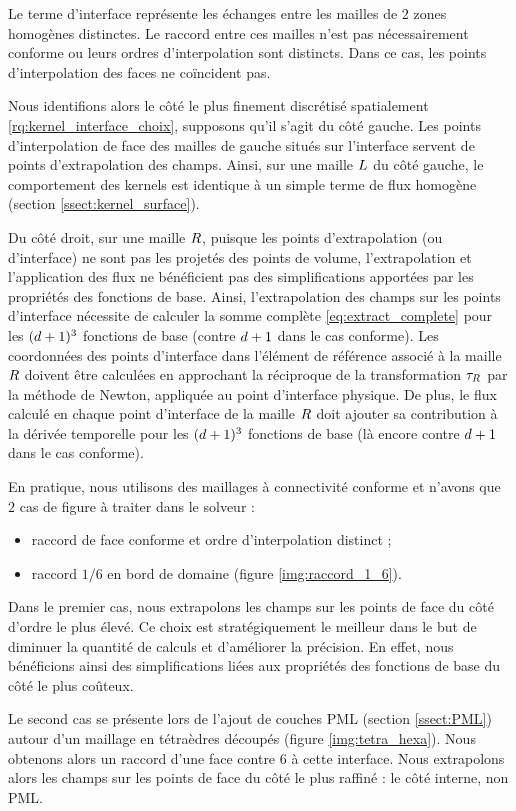 Le terme d'interface représente les échanges entre les
mailles de $2$ zones homogènes distinctes. Le raccord entre ces mailles
n'est pas nécessairement conforme ou leurs ordres d'interpolation sont
distincts. Dans ce cas, les points d'interpolation des faces
ne coïncident pas.

Nous identifions alors le côté le plus finement discrétisé spatialement
\ref{rq:kernel_interface_choix}, supposons qu'il s'agit du côté gauche.
Les points d'interpolation de face des mailles de gauche situés
sur l'interface servent de points d'extrapolation des champs.
Ainsi, sur une maille $L$ du côté gauche,
le comportement des kernels est identique
à un simple terme de flux homogène (section \ref{ssect:kernel_surface}).

Du côté droit, sur une maille $R$,
puisque les points d'extrapolation (ou d'interface)
ne sont pas les projetés des points de volume, l'extrapolation
et l'application des flux ne bénéficient pas des simplifications
apportées par les propriétés des fonctions de base.
Ainsi, l'extrapolation des champs sur les points d'interface
nécessite de calculer la somme complète \eqref{eq:extract_complete}
pour les $(d + 1)^3$ fonctions de base (contre $d+1$ dans le cas conforme).
Les coordonnées des points d'interface dans l'élément de référence
associé à la maille $R$ doivent être calculées
en approchant la réciproque de la transformation
$\tau_{R}$ par la méthode de Newton, appliquée
au point d'interface physique.
De plus, le flux calculé en chaque point d'interface de la maille
$R$ doit ajouter sa contribution à la dérivée temporelle
pour les $(d + 1)^3$ fonctions de base (là encore contre $d+1$
dans le cas conforme).

\begin{remark} \label{rq:kernel_interface_choix}
	En pratique, nous utilisons des maillages à connectivité conforme et
	n'avons que $2$ cas de figure à traiter dans le solveur :
	\begin{itemize}
		\item raccord de face conforme et ordre d'interpolation distinct ;
		\item raccord $1/6$ en bord de domaine (figure \ref{img:raccord_1_6}).
	\end{itemize}
	
	Dans le premier cas, nous extrapolons les champs sur les points
	de face du côté d'ordre le plus élevé. Ce choix est stratégiquement
	le meilleur dans le but de diminuer la quantité de calculs et d'améliorer la précision.
	En effet, nous bénéficions ainsi des simplifications liées
	aux propriétés des fonctions de base du côté le plus coûteux.
	
	Le second cas se présente lors de l'ajout de couches PML
	(section \ref{ssect:PML}) autour d'un maillage en tétraèdres découpés (figure \ref{img:tetra_hexa}).
	Nous obtenons alors un raccord d'une face contre $6$ à cette interface.
	Nous extrapolons alors les champs sur les points de face du côté le
	plus raffiné : le côté interne, non PML.
	\\
\end{remark}


